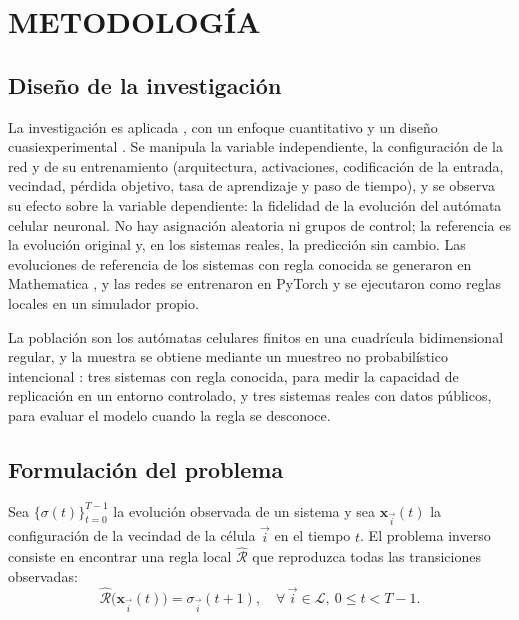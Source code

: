 \section{METODOLOGÍA}
\label{sec:metodologia}

\subsection{Diseño de la investigación}

La investigación es aplicada \cite{veracruz_aplicada}, con un enfoque cuantitativo \cite{jaen_cuantitativa} y un diseño cuasiexperimental \cite{capili2024_cuasiexperimento}. Se manipula la variable independiente, la configuración de la red y de su entrenamiento (arquitectura, activaciones, codificación de la entrada, vecindad, pérdida objetivo, tasa de aprendizaje y paso de tiempo), y se observa su efecto sobre la variable dependiente: la fidelidad de la evolución del autómata celular neuronal. No hay asignación aleatoria ni grupos de control; la referencia es la evolución original y, en los sistemas reales, la predicción sin cambio. Las evoluciones de referencia de los sistemas con regla conocida se generaron en Mathematica \cite{mathematica_2024}, y las redes se entrenaron en PyTorch y se ejecutaron como reglas locales en un simulador propio.

La población son los autómatas celulares finitos en una cuadrícula bidimensional regular, y la muestra se obtiene mediante un muestreo no probabilístico intencional \cite{diaz2017_muestra}: tres sistemas con regla conocida, para medir la capacidad de replicación en un entorno controlado, y tres sistemas reales con datos públicos, para evaluar el modelo cuando la regla se desconoce.

\subsection{Formulación del problema}
\label{sec:formulacion}

Sea $\{\sigma(t)\}_{t=0}^{T-1}$ la evolución observada de un sistema y sea $\mathbf{x}_{\vec{i}}(t)$ la configuración de la vecindad de la célula $\vec{i}$ en el tiempo $t$. El problema inverso consiste en encontrar una regla local $\hat{\mathcal{R}}$ que reproduzca todas las transiciones observadas:
\begin{equation}
	\hat{\mathcal{R}}\big(\mathbf{x}_{\vec{i}}(t)\big) = \sigma_{\vec{i}}(t+1), \quad \forall\, \vec{i} \in \mathcal{L},\ 0 \le t < T-1.
	\label{eq:problema_inverso}
\end{equation}

